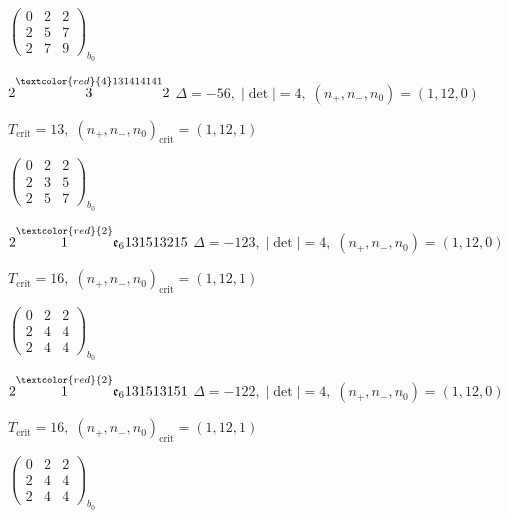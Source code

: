 \documentclass[10pt]{article}
\begin{document}
\hspace{2em}$\left(\begin{smallmatrix}0 & 2 & 2 \\ 2 & 5 & 7 \\ 2 & 7 & 9\end{smallmatrix}\right)_{\!b_0}$

$2\overset{\textcolor{red}{4}131414141}{3}2$ \quad $\Delta=-56,\; |\det|=4,\; (n_+,n_-,n_0)=(1,12,0)$

\hspace{1em}$T_{\text{crit}}=13,\; (n_+,n_-,n_0)_{\text{crit}}=(1,12,1)$

\hspace{2em}$\left(\begin{smallmatrix}0 & 2 & 2 \\ 2 & 3 & 5 \\ 2 & 5 & 7\end{smallmatrix}\right)_{\!b_0}$

\smallskip

$2\overset{\textcolor{red}{2}}{1}\mathfrak{e}_6131513215$ \quad $\Delta=-123,\; |\det|=4,\; (n_+,n_-,n_0)=(1,12,0)$

\hspace{1em}$T_{\text{crit}}=16,\; (n_+,n_-,n_0)_{\text{crit}}=(1,12,1)$

\hspace{2em}$\left(\begin{smallmatrix}0 & 2 & 2 \\ 2 & 4 & 4 \\ 2 & 4 & 4\end{smallmatrix}\right)_{\!b_0}$

\smallskip

$2\overset{\textcolor{red}{2}}{1}\mathfrak{e}_6131513151$ \quad $\Delta=-122,\; |\det|=4,\; (n_+,n_-,n_0)=(1,12,0)$

\hspace{1em}$T_{\text{crit}}=16,\; (n_+,n_-,n_0)_{\text{crit}}=(1,12,1)$

\hspace{2em}$\left(\begin{smallmatrix}0 & 2 & 2 \\ 2 & 4 & 4 \\ 2 & 4 & 4\end{smallmatrix}\right)_{\!b_0}$

\smallskip
\end{document}
